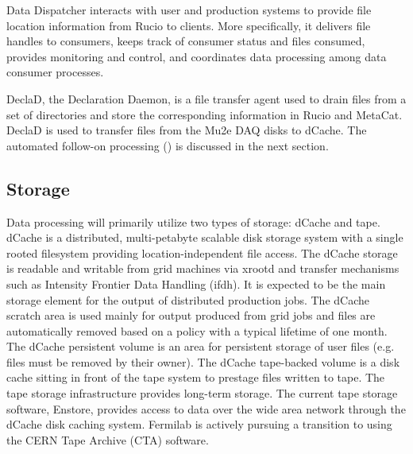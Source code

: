 Data Dispatcher interacts with user and production systems to provide file location information from Rucio to clients. More specifically, it delivers file handles to consumers, keeps track of consumer status and files consumed, provides monitoring and control, and coordinates data processing among data consumer processes.

DeclaD, the Declaration Daemon, is a file transfer agent used to drain files from a set of directories and store the corresponding information in Rucio and MetaCat. DeclaD is used to transfer files from the Mu2e DAQ disks to dCache. The automated follow-on processing (\passone) is discussed in the next section.

\subsection{Storage}
Data processing will primarily utilize two types of storage: dCache and tape. dCache is a distributed, multi-petabyte scalable disk storage system with a single rooted filesystem providing location-independent file access. The dCache storage is readable and writable from grid machines via xrootd and transfer mechanisms such as Intensity Frontier Data Handling (ifdh). It is expected to be the main storage element for the output of distributed production jobs. The dCache scratch area is used mainly for output produced from grid jobs and files are automatically removed based on a policy with a typical lifetime of one month. The dCache persistent volume is an area for persistent storage of user files (e.g. files must be removed by their owner). The dCache tape-backed volume is a disk cache sitting in front of the tape system to prestage files written to tape. The tape storage infrastructure provides long-term storage. The current tape storage software, Enstore, provides access to data over the wide area network through the dCache disk caching system. Fermilab is actively pursuing a transition to using the CERN Tape Archive (CTA) software.

